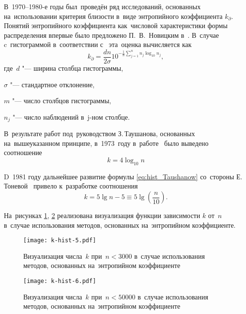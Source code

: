 \documentclass[]{scrartcl}
\begin{document}
В~1970--1980-е годы был~проведён ряд исследований, основанных на~использовании критерия близости в~виде энтропийного коэффициента $k_\partial$. Понятий энтропийного коэффициента как~числовой характеристики формы распределения впервые было предложено П.~В.~Новицким в~\cite{Nowiczkij:Entrop-koef}. В~случае c~гистограммой в~соответствии с~\cite{Nowiczkij:Elektrich} эта~оценка вычисляется как
\begin{equation}\label{eq:hist_Nowiczkij}
k_\partial = \frac{dn}{2\sigma}10^{-\frac{1}{n}\sum\limits_{j=1}^n n_j \log_{10}n_j},
\end{equation}
где~$d$ "--- ширина столбца гистограммы,

$\sigma$ "--- стандартное отклонение,

$m$ "--- число столбцов гистограммы,

$n_j$ "--- число наблюдений в~j-ном столбце.

В~результате работ  под~руководством З.\,Таушанова, основанных на~вышеуказанном принципе, в~1973~году в~работе~\cite{Taushanow-k-hist} было выведено соотношение
\begin{equation}\label{eq:hist_Taushanow}
k = 4 \log_{10}{n}
\end{equation}

D~1981 году дальнейшее развитие формулы \ref{eq:hist_Taushanow} со~стороны Е.\,Тоневой~\cite{Tonewa:k-hist} привело к~разработке соотношения
\begin{equation}\label{eq:hist_Tonewa}
k = 5 \lg n - 5 \equiv 5 \lg (\frac{n}{10}).
\end{equation}

На~рисунках \ref{fig:k-hist-n5}, \ref{fig:k-hist-n6} реализована визуализация функции зависимости $k$ от~$n$ в~случае использования методов, основанных на~энтропийном коэффициенте.

\begin{figure}[ht]
	\centering %
	\texttt{[image: k-hist-5.pdf]}
	\caption{Визуализация числа~$k$ при~$n < 3000$ в~случае использования методов, основанных на~энтропийном коэффициенте}\label{fig:k-hist-n5}
\end{figure}

\begin{figure}[ht]
	\centering %
	\texttt{[image: k-hist-6.pdf]}
	\caption{Визуализация числа~$k$ при~$n < 50000$ в~случае использования методов, основанных на~энтропийном коэффициенте}\label{fig:k-hist-n6}
\end{figure}
\end{document}
